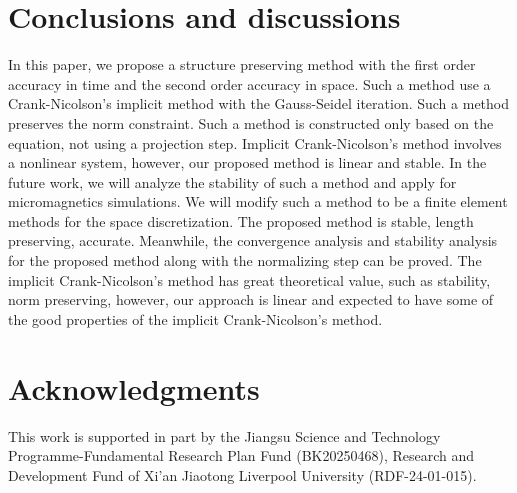 \documentclass[preprint,times,3p]{elsarticle}
\begin{document}


\section{Conclusions and discussions}
\label{sec:conclusions}

In this paper, we propose a structure preserving method with the first order accuracy in time and the second order accuracy in space. Such a method use a Crank-Nicolson's implicit method with the Gauss-Seidel iteration. Such a method preserves the norm constraint. Such a method is constructed only based on the equation, not using a projection step. Implicit Crank-Nicolson's method involves a nonlinear system, however, our proposed method is linear and stable. In the future work, we will analyze the stability of such a method and apply for micromagnetics simulations. We will modify such a method to be a finite element methods for the space discretization. The proposed method is stable, length preserving, accurate. Meanwhile, the convergence analysis and stability analysis for the proposed method along with the normalizing step can be proved. The implicit Crank-Nicolson's method has great theoretical value, such as stability, norm preserving, however, our approach is linear and expected to have some of the good properties of the implicit Crank-Nicolson's method.

\section*{Acknowledgments}
This work is supported in part by the Jiangsu Science and Technology Programme-Fundamental Research Plan Fund (BK20250468), Research and
Development Fund of Xi'an Jiaotong Liverpool University (RDF-24-01-015).


\vspace{1cm}
\end{document}
